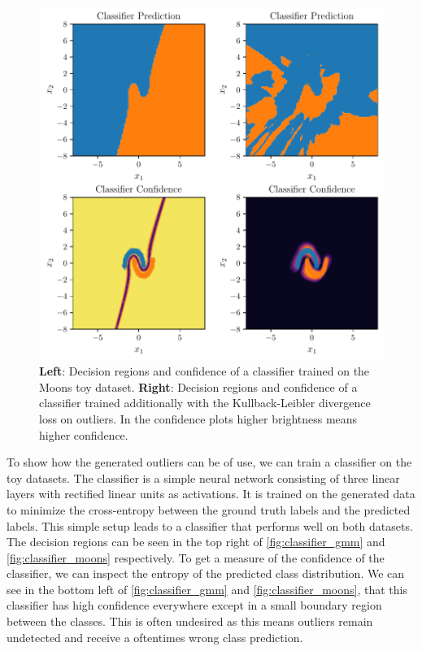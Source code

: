 \begin{figure}[htpb]
	\centering
        \includegraphics{figures/toy_example/moons/classifier.pdf}
        \caption{\textbf{Left}: Decision regions and confidence of a classifier trained on the
            Moons toy dataset. \textbf{Right}: Decision regions and
            confidence of a classifier trained additionally with the
        Kullback-Leibler divergence loss on outliers. In the confidence plots
    higher brightness means higher confidence.}%
	\label{fig:classifier_moons}
\end{figure}

To show how the generated outliers can be of use, we can train a classifier on
the toy datasets. The classifier is a simple neural network consisting of three
linear layers with rectified linear units as activations. It is trained on the
generated data to minimize the cross-entropy between the ground truth labels
and the predicted labels. This simple setup leads to a classifier that
performs well on both datasets. The decision regions can be seen in the top
right of
\autoref{fig:classifier_gmm} and \autoref{fig:classifier_moons} respectively. To get a
measure of the confidence of the classifier, we can inspect the entropy of the
predicted class distribution. We can see in the bottom left of
\autoref{fig:classifier_gmm} and
\autoref{fig:classifier_moons}, that this classifier has high confidence
everywhere except in a small boundary region between the classes. This is often
undesired as this means outliers remain undetected and receive a oftentimes
wrong class prediction.

